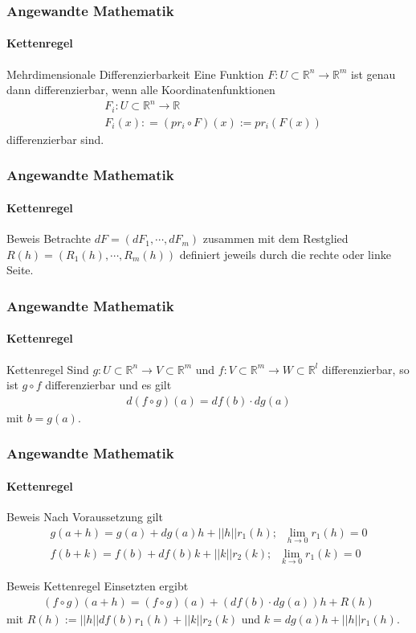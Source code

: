 \documentclass{beamer}
\begin{document}
\begin{frame}
    \frametitle{Angewandte Mathematik}
\framesubtitle{Kettenregel}

    \begin{block}{Mehrdimensionale Differenzierbarkeit}
Eine Funktion $F: U \subset \mathbb{R}^n \to \mathbb{R}^m$ ist genau dann differenzierbar, wenn alle Koordinatenfunktionen
\begin{align*}
& F_i :U \subset \mathbb{R}^n \to \mathbb{R} \\
& F_i(x): = (pr_i \circ F) (x) := pr_i(F(x))
\end{align*}
differenzierbar sind.
\end{block}

 \end{frame}



\begin{frame}
    \frametitle{Angewandte Mathematik}
\framesubtitle{Kettenregel}

    \begin{block}{Beweis}
Betrachte $dF = (dF_1, \cdots, dF_m) $ zusammen mit dem  Restglied $R(h)  = (R_1(h), \cdots, R_m(h))$ definiert jeweils durch die rechte oder linke Seite.
\end{block}

 \end{frame}




\begin{frame}
    \frametitle{Angewandte Mathematik}
\framesubtitle{Kettenregel}
\begin{block}{Kettenregel}
Sind $g: U \subset \mathbb{R}^n \to V  \subset \mathbb{R}^m$ und $f: V \subset \mathbb{R}^m \to W  \subset \mathbb{R}^l$ differenzierbar, so ist $g \circ f$ differenzierbar und es gilt
\begin{align*}
d(f \circ g)(a) = df(b) \cdot dg(a)
\end{align*}
mit $b = g(a)$.
\end{block}

 \end{frame}



\begin{frame}
    \frametitle{Angewandte Mathematik}
\framesubtitle{Kettenregel}
    \begin{block}{Beweis}
Nach Voraussetzung gilt
\begin{align*}
g(a + h) = g(a) + dg(a)h + ||h||r_1(h);  \; \; \lim_{h \to 0} r_1(h) = 0\\
f(b + k) = f(b) + df(b)k + ||k||r_2(k); \; \; \lim_{k \to 0} r_1(k) = 0
\end{align*}
\end{block}

    \begin{block}{Beweis Kettenregel}
Einsetzten ergibt 
\begin{align*}
(f \circ g)(a + h) = (f \circ g)(a)  + (df(b) \cdot dg(a) )h + R(h)
\end{align*}
mit $R(h):= ||h|| df(b) r_1(h) + ||k|| r_2(k)$  und $k= dg(a)h + ||h||r_1(h)$.
\end{block}
 \end{frame}
\end{document}
